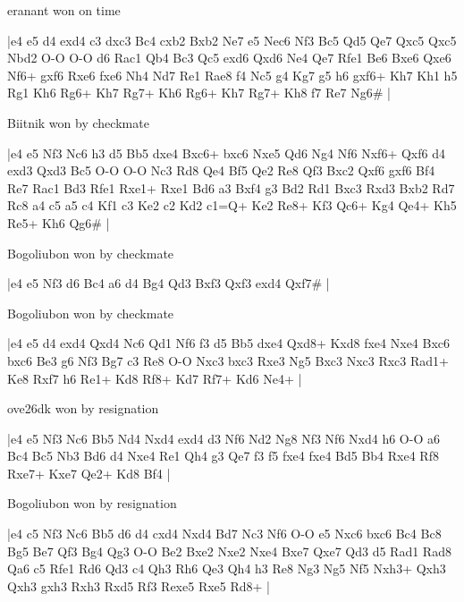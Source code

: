 eranant won on time

\makegametitle
|e4 e5 d4 exd4 c3 dxc3 Bc4 cxb2 Bxb2 Ne7 e5 Nec6 Nf3 Bc5 Qd5 Qe7 Qxc5 Qxc5 Nbd2 O-O O-O d6 Rac1 Qb4 Bc3 Qc5 exd6 Qxd6 Ne4 Qe7 Rfe1 Be6 Bxe6 Qxe6 Nf6+ gxf6 Rxe6 fxe6 Nh4 Nd7 Re1 Rae8 f4 Nc5 g4 Kg7 g5 h6 gxf6+ Kh7 Kh1 h5 Rg1 Kh6 Rg6+ Kh7 Rg7+ Kh6 Rg6+ Kh7 Rg7+ Kh8 f7 Re7 Ng6\#  |

\showboard

Biitnik won by checkmate

\makegametitle
|e4 e5 Nf3 Nc6 h3 d5 Bb5 dxe4 Bxc6+ bxc6 Nxe5 Qd6 Ng4 Nf6 Nxf6+ Qxf6 d4 exd3 Qxd3 Bc5 O-O O-O Nc3 Rd8 Qe4 Bf5 Qe2 Re8 Qf3 Bxc2 Qxf6 gxf6 Bf4 Re7 Rac1 Bd3 Rfe1 Rxe1+ Rxe1 Bd6 a3 Bxf4 g3 Bd2 Rd1 Bxc3 Rxd3 Bxb2 Rd7 Rc8 a4 c5 a5 c4 Kf1 c3 Ke2 c2 Kd2 c1=Q+ Ke2 Re8+ Kf3 Qc6+ Kg4 Qe4+ Kh5 Re5+ Kh6 Qg6\#  |

\showboard

Bogoliubon won by checkmate

\makegametitle
|e4 e5 Nf3 d6 Bc4 a6 d4 Bg4 Qd3 Bxf3 Qxf3 exd4 Qxf7\#  |

\showboard

Bogoliubon won by checkmate

\makegametitle
|e4 e5 d4 exd4 Qxd4 Nc6 Qd1 Nf6 f3 d5 Bb5 dxe4 Qxd8+ Kxd8 fxe4 Nxe4 Bxc6 bxc6 Be3 g6 Nf3 Bg7 c3 Re8 O-O Nxc3 bxc3 Rxe3 Ng5 Bxc3 Nxc3 Rxc3 Rad1+ Ke8 Rxf7 h6 Re1+ Kd8 Rf8+ Kd7 Rf7+ Kd6 Ne4+  |

\showboard

ove26dk won by resignation

\makegametitle
|e4 e5 Nf3 Nc6 Bb5 Nd4 Nxd4 exd4 d3 Nf6 Nd2 Ng8 Nf3 Nf6 Nxd4 h6 O-O a6 Bc4 Bc5 Nb3 Bd6 d4 Nxe4 Re1 Qh4 g3 Qe7 f3 f5 fxe4 fxe4 Bd5 Bb4 Rxe4 Rf8 Rxe7+ Kxe7 Qe2+ Kd8 Bf4  |

\showboard

Bogoliubon won by resignation

\makegametitle
|e4 c5 Nf3 Nc6 Bb5 d6 d4 cxd4 Nxd4 Bd7 Nc3 Nf6 O-O e5 Nxc6 bxc6 Bc4 Bc8 Bg5 Be7 Qf3 Bg4 Qg3 O-O Be2 Bxe2 Nxe2 Nxe4 Bxe7 Qxe7 Qd3 d5 Rad1 Rad8 Qa6 c5 Rfe1 Rd6 Qd3 c4 Qh3 Rh6 Qe3 Qh4 h3 Re8 Ng3 Ng5 Nf5 Nxh3+ Qxh3 Qxh3 gxh3 Rxh3 Rxd5 Rf3 Rexe5 Rxe5 Rd8+  |

